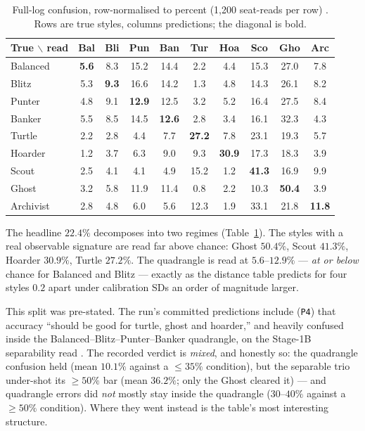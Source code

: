 \documentclass[11pt]{article}
\newcommand{\code}[1]{\texttt{#1}}
\begin{document}
\begin{table}[t]
\centering
\caption{Full-log confusion, row-normalised to percent (1{,}200 seat-reads per row)
\cite{artifact}. Rows are true styles, columns predictions; the diagonal is bold.}
\label{tab:confusion}
\footnotesize
\setlength{\tabcolsep}{4.5pt}
\begin{tabular}{@{}lccccccccc@{}}
\toprule
True $\backslash$ read & Bal & Bli & Pun & Ban & Tur & Hoa & Sco & Gho & Arc \\
\midrule
Balanced  & \textbf{5.6}  & 8.3 & 15.2 & 14.4 & 2.2  & 4.4  & 15.3 & 27.0 & 7.8 \\
Blitz     & 5.3 & \textbf{9.3}  & 16.6 & 14.2 & 1.3  & 4.8  & 14.3 & 26.1 & 8.2 \\
Punter    & 4.8 & 9.1 & \textbf{12.9} & 12.5 & 3.2  & 5.2  & 16.4 & 27.5 & 8.4 \\
Banker    & 5.5 & 8.5 & 14.5 & \textbf{12.6} & 2.8  & 3.4  & 16.1 & 32.3 & 4.3 \\
Turtle    & 2.2 & 2.8 & 4.4  & 7.7  & \textbf{27.2} & 7.8  & 23.1 & 19.3 & 5.7 \\
Hoarder   & 1.2 & 3.7 & 6.3  & 9.0  & 9.3  & \textbf{30.9} & 17.3 & 18.3 & 3.9 \\
Scout     & 2.5 & 4.1 & 4.1  & 4.9  & 15.2 & 1.2  & \textbf{41.3} & 16.9 & 9.9 \\
Ghost     & 3.2 & 5.8 & 11.9 & 11.4 & 0.8  & 2.2  & 10.3 & \textbf{50.4} & 3.9 \\
Archivist & 2.8 & 4.8 & 6.0  & 5.6  & 12.3 & 1.9  & 33.1 & 21.8 & \textbf{11.8} \\
\bottomrule
\end{tabular}
\end{table}

The headline $22.4\%$ decomposes into two regimes (Table~\ref{tab:confusion}). The styles
with a real observable signature are read far above chance: Ghost $50.4\%$, Scout $41.3\%$,
Hoarder $30.9\%$, Turtle $27.2\%$. The quadrangle is read at $5.6$--$12.9\%$ ---
\emph{at or below} chance for Balanced and Blitz --- exactly as the distance table predicts
for four styles $0.2$ apart under calibration SDs an order of magnitude larger.

This split was pre-stated. The run's committed predictions include (\code{P4}) that
accuracy ``should be good for turtle, ghost and hoarder,'' and heavily confused inside the
Balanced--Blitz--Punter--Banker quadrangle, on the Stage-1B separability read
\cite{artifact}. The recorded verdict is \emph{mixed}, and honestly so: the quadrangle
confusion held (mean $10.1\%$ against a $\le 35\%$ condition), but the separable trio
under-shot its $\ge 50\%$ bar (mean $36.2\%$; only the Ghost cleared it) --- and quadrangle
errors did \emph{not} mostly stay inside the quadrangle ($30$--$40\%$ against a $\ge 50\%$
condition). Where they went instead is the table's most interesting structure.
\end{document}
